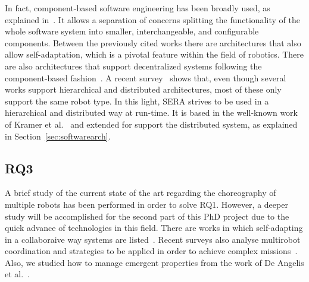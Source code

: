 In fact, component-based software engineering has been broadly used, as explained in~\cite{Brugali2009}. 
It allows a separation of concerns splitting the functionality of the whole software system into smaller, interchangeable, and configurable components. 
Between the previously cited works there are architectures that also allow self-adaptation, which is a pivotal feature within the field of robotics.
There are also architectures that support decentralized systems following the component-based fashion~\cite{Lesire2016}.
A recent survey~\cite{Zhi} shows that, even though several works support hierarchical and distributed architectures, most of these only support the same robot type. 
In this light, SERA strives to be used in a hierarchical and distributed way at run-time.
It is based in the well-known work of Kramer et al.~\cite{kramer} and extended for support the distributed system, as explained in Section~\ref{sec:softwarearch}.

\subsection{RQ3}

A brief study of the current state of the art regarding the choreography of multiple robots has been performed in order to solve RQ1.
However, a deeper study will be accomplished for the second part of this PhD project due to the quick advance of technologies in this field.
There are works in which self-adapting in a collaboraive way systems are listed~\cite{DeLemos2013}.
Recent surveys also analyse multirobot coordination and strategies to be applied in order to achieve complex missions~\cite{Yan2013}.
Also, we studied how to manage emergent properties from the work of De Angelis et al.~\cite{DeAngelis2015,DeAngelis2016}.
